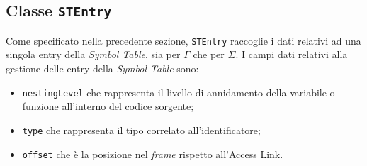 \documentclass[../report.tex]{subfiles}
\begin{document}
\subsection[Classe STEntry]{Classe \texttt{STEntry}}
Come specificato nella precedente sezione, \verb|STEntry| raccoglie i dati relativi ad una singola entry della \textit{Symbol Table}, sia per $\Gamma{}$ che per $\Sigma{}$.
I campi dati relativi alla gestione delle entry della \textit{Symbol Table} sono:
\begin{itemize}
    \item \verb|nestingLevel| che rappresenta il livello di annidamento della variabile o funzione all'interno del codice sorgente;
    \item \verb|type| che rappresenta il tipo correlato all'identificatore;
    \item \verb|offset| che è la posizione nel \textit{frame} rispetto all'Access Link.
\end{itemize}
\end{document}
